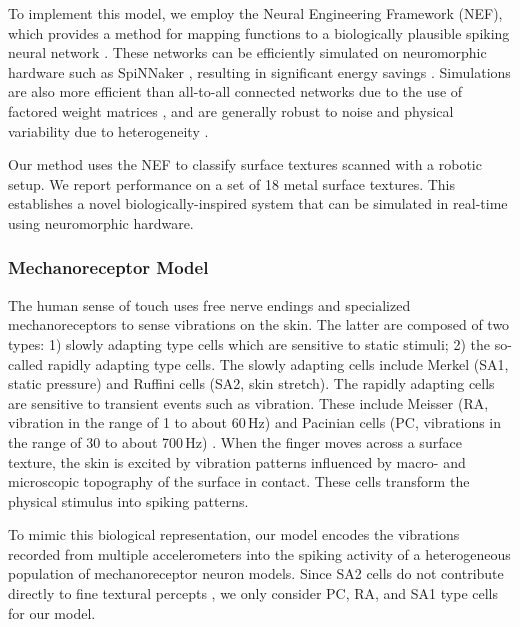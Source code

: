 To implement this model, we employ  the Neural Engineering Framework (NEF), which  provides a method for mapping functions to a biologically plausible spiking neural network \citep{eliasmith2003a}. %
These networks can be efficiently simulated on neuromorphic hardware such as SpiNNaker \citep{mundy2015}, resulting in significant energy savings \citep{hasler2013finding}. Simulations are also more efficient than all-to-all connected networks due to the use of factored weight matrices \citep{bekolay2013},  and are generally robust to noise and physical variability due to heterogeneity \citep{hunsberger2014}.

Our method uses the NEF to classify surface textures scanned with a robotic setup. We report performance on a set of 18 metal surface textures. This establishes a novel biologically-inspired system that can be simulated in real-time using neuromorphic hardware.

\subsubsection{Mechanoreceptor Model}

\newcommand{\gammafactor}{\mbox{\it $\Gamma$-factor} (GF)}

The human sense of touch uses free nerve endings and specialized mechanoreceptors to sense vibrations on the skin. The latter are composed of two types: 1) slowly adapting type cells which are sensitive to static stimuli; 2) the so-called rapidly adapting type cells. The slowly adapting cells include Merkel (SA1, static pressure) and Ruffini cells (SA2, skin stretch). The rapidly adapting cells are sensitive to transient events such as vibration. These include Meisser (RA, vibration in the range of 1 to about 60\,Hz) and Pacinian cells (PC, vibrations in the range of 30 to about 700\,Hz) \cite{johansson2009coding}. When the finger moves across a surface texture, the skin is excited by vibration patterns influenced by macro- and microscopic topography of the surface in contact. These cells transform the physical stimulus into spiking patterns.

To mimic this biological representation, our model encodes the vibrations recorded from multiple accelerometers into the spiking activity of a heterogeneous population of mechanoreceptor neuron models.  Since SA2 cells do not contribute directly to fine textural percepts \cite{weber2013spatial}, we only consider PC,  RA, and SA1 type cells for our model. 

